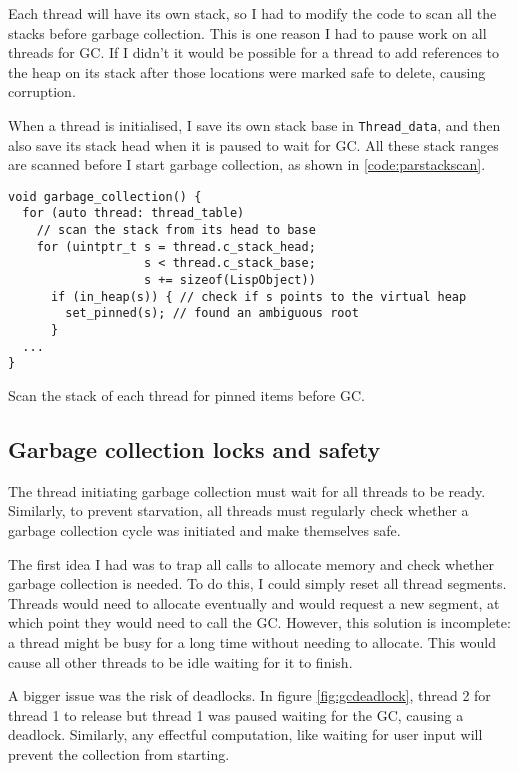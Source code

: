 Each thread will have its own stack, so I had to modify the code to scan all the stacks before garbage
collection. This is one reason I had to pause work on all threads for GC. If I didn't it would be possible
for a thread to add references to the heap on its stack after those locations were marked safe to delete,
causing corruption.

When a thread is initialised, I save its own stack base in \verb|Thread_data|, and then also save its stack head
when it is paused to wait for GC. All these stack ranges are scanned before I start garbage collection, as shown
in \ref{code:parstackscan}.

\begin{code}
\begin{verbatim}
void garbage_collection() {
  for (auto thread: thread_table)
    // scan the stack from its head to base
    for (uintptr_t s = thread.c_stack_head;
                   s < thread.c_stack_base;
                   s += sizeof(LispObject))
      if (in_heap(s)) { // check if s points to the virtual heap
        set_pinned(s); // found an ambiguous root
      }
  ...
}
\end{verbatim}
\caption{Scan the stack of each thread for pinned items before GC.}
\label{code:parstackscan}
\end{code}

\subsection{Garbage collection locks and safety}
\label{sec:gclock}
The thread initiating garbage collection must wait for all
threads to be ready. Similarly, to prevent starvation, all threads must regularly check
whether a garbage collection cycle was initiated and make themselves safe.

The first idea I had was to trap all calls to allocate memory and check whether garbage collection is needed.
To do this, I could simply reset all thread segments. Threads would need to allocate eventually and
would request a new segment, at which point they would need to call the GC. However, this solution is incomplete:
a thread might be busy for a long time without needing to allocate. This would cause all other
threads to be idle waiting for it to finish.

A bigger issue was the risk of deadlocks. In figure \ref{fig:gcdeadlock}, thread 2 for thread 1 to release
but thread 1 was paused waiting for the GC, causing a deadlock. Similarly, any effectful computation,
like waiting for user input will prevent the collection from starting.

